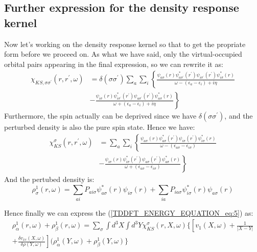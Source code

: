 \subsection{Further expression for the density response kernel}
%
%
%
%
Now let's working on the density response kernel so that to get the
propriate form before we proceed on. As what we have said, only the
virtual-occupied orbital pairs appearing in the final expression, so
we can rewrite it as:
\begin{equation}\label{TDDFT_ENERGY_EQUATION_eq:6}
\begin{split}
 \chi_{KS,\sigma\sigma^{'}}(r,r^{'}, \omega)
&=\delta(\sigma\sigma^{'})
\sum_{a}\sum_{i}\left\lbrace 
\frac{\psi_{a\sigma}(r)\psi_{a\sigma^{'}}^{*}(r^{'})
\psi_{i\sigma^{'}}(r^{'})\psi_{i\sigma}^{*}(r)} {\omega -
(\epsilon_{a} - \epsilon_{i}) + i\eta} \right. \\
&- \left. 
\frac{\psi_{i\sigma}(r)\psi_{i\sigma^{'}}^{*}(r^{'})
\psi_{a\sigma^{'}}(r^{'})\psi_{a\sigma}^{*}(r)} {\omega +
(\epsilon_{a} - \epsilon_{i}) + i\eta} \right\rbrace 
\end{split}
\end{equation}
Furthermore, the spin actually can be deprived since we have
$\delta(\sigma\sigma^{'})$, and the perturbed density is also the
pure spin state. Hence we have:
\begin{equation}\label{TDDFT_ENERGY_EQUATION_eq:7}
\begin{split}
 \chi_{KS}^{\sigma}(r,r^{'}, \omega)
&=
\sum_{a}\sum_{i}\left\lbrace 
\frac{\psi_{a\sigma}(r)\psi_{a\sigma}^{*}(r^{'})
\psi_{i\sigma}(r^{'})\psi_{i\sigma}^{*}(r)} {\omega -
(\epsilon_{a\sigma} - \epsilon_{i\sigma})} \right. \\
&- \left. 
\frac{\psi_{i\sigma}(r)\psi_{i\sigma}^{*}(r^{'})
\psi_{a\sigma}(r^{'})\psi_{a\sigma}^{*}(r)} {\omega +
(\epsilon_{a\sigma} - \epsilon_{i\sigma})} \right\rbrace 
\end{split}
\end{equation}
And the pertubed density is:
\begin{equation}
 \label{TDDFT_ENERGY_EQUATION_eq:general_density}
\rho^{1}_{\sigma}(r,\omega) =
\sum_{ai}P_{ai\sigma}\psi^{*}_{a\sigma}(r)\psi_{i\sigma}(r) +
\sum_{ia}P_{ia\sigma}\psi^{*}_{i\sigma}(r)\psi_{a\sigma}(r)
\end{equation}

Hence finally we can express the (\ref{TDDFT_ENERGY_EQUATION_eq:5})
as:
\begin{multline}\label{TDDFT_ENERGY_EQUATION_eq:general}
\rho^{1}_{\alpha}(r,\omega) + \rho^{1}_{\beta}(r,\omega) = 
\sum_{\sigma}\int d^{3}X \int d^{3}Y\chi_{KS}^{\sigma}(r, X, \omega)
\Bigg\{\left[ v_{1}(X,\omega) + \frac{1}{|X-Y|} \right. \\
\left. + \frac{\delta
v_{xc}(X,\omega)}{\delta
\rho(Y,\omega)}\right] (\rho^{1}_{\alpha}(Y,\omega) +
\rho^{1}_{\beta}(Y,\omega) \Bigg\}
\end{multline}

